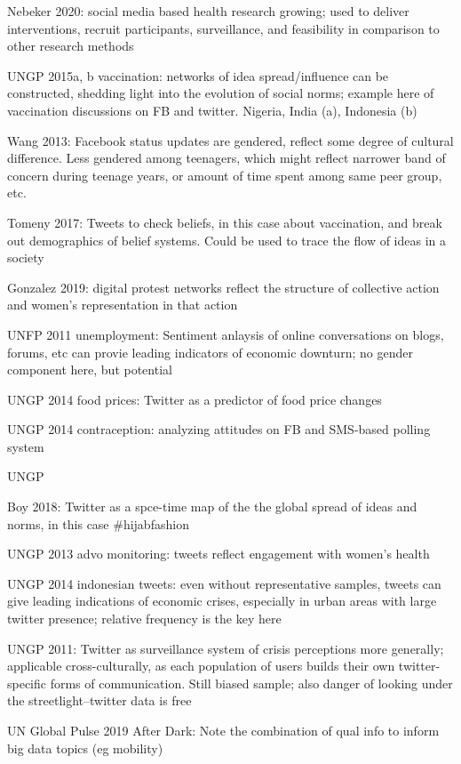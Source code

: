 \documentclass{article}
\begin{document}
Nebeker 2020: social media based health research growing; used to deliver interventions, recruit participants, surveillance, and feasibility in comparison to other research methods

UNGP 2015a, b vaccination: networks of idea spread/influence can be constructed, shedding light into the evolution of social norms; example here of vaccination discussions on FB and twitter. Nigeria, India (a), Indonesia (b)

Wang 2013: Facebook status updates are gendered, reflect some degree of cultural difference. Less gendered among teenagers, which might reflect narrower band of concern during teenage years, or amount of time spent among same peer group, etc.

Tomeny 2017: Tweets to check beliefs, in this case about vaccination, and break out demographics of belief systems. Could be used to trace the flow of ideas in a society

Gonzalez 2019: digital protest networks reflect the structure of collective action and women's representation in that action

UNFP 2011 unemployment: Sentiment anlaysis of online conversations on blogs, forums, etc can provie leading indicators of economic downturn; no gender component here, but potential

UNGP 2014 food prices: Twitter as a predictor of food price changes

UNGP 2014 contraception: analyzing attitudes on FB and SMS-based polling system

UNGP

Boy 2018: Twitter as a spce-time map of the the global spread of ideas and norms, in this case #hijabfashion

UNGP 2013 advo monitoring: tweets reflect engagement with women's health

UNGP 2014 indonesian tweets: even without representative samples, tweets can give leading indications of economic crises, especially in urban areas with large twitter presence; relative frequency is the key here

UNGP 2011: Twitter as surveillance system of crisis perceptions more generally; applicable cross-culturally, as each population of users builds their own twitter-specific forms of communication. Still biased sample; also danger of looking under the streetlight--twitter data is free

UN Global Pulse 2019 After Dark: Note the combination of qual info to inform big data topics (eg mobility)
\end{document}
